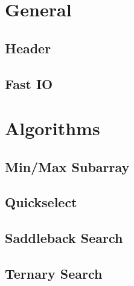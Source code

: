 \documentclass[landscape, 10pt]{article}
\begin{document}
\begin{multicols}{4}

\tableofcontents
\section{General}
\subsection{Header}

\subsection{Fast IO}


\section{Algorithms}
\subsection{Min/Max Subarray}

\subsection{Quickselect}

\subsection{Saddleback Search}

\subsection{Ternary Search}




\end{multicols}
\end{document}
